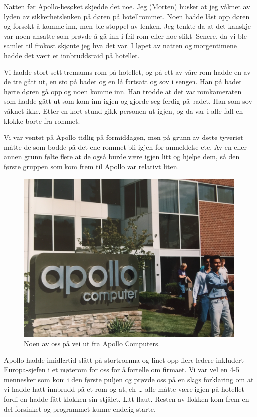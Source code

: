 \documentclass[../../main.tex]{subfiles}
\begin{document}
Natten før Apollo-besøket skjedde det noe. Jeg (Morten) husker at jeg våknet av lyden av sikkerhetslenken på døren på hotellrommet. Noen hadde låst opp døren og forsøkt å komme inn, men ble stoppet av lenken. Jeg tenkte da at det kanskje var noen ansatte som prøvde å gå inn i feil rom eller noe slikt. Senere, da vi ble samlet til frokost skjønte jeg hva det var. I løpet av natten og morgentimene hadde det vært et innbruddsraid på hotellet.

Vi hadde stort sett tremanns-rom på hotellet, og på ett av våre rom hadde en av de tre gått ut, en sto på badet og en lå fortsatt og sov i sengen. Han på badet hørte døren gå opp og noen komme inn. Han trodde at det var romkameraten som hadde gått ut som kom inn igjen og gjorde seg ferdig på badet. Han som sov våknet ikke. Etter en kort stund gikk personen ut igjen, og da var i alle fall en klokke borte fra rommet.

Vi var ventet på Apollo tidlig på formiddagen, men på grunn av dette tyveriet måtte de som bodde på det ene rommet bli igjen for anmeldelse etc. Av en eller annen grunn følte flere at de også burde være igjen litt og hjelpe dem, så den første gruppen som kom frem til Apollo var relativt liten. 

\begin{figure}
	\includegraphics[width=\linewidth]{images/usa88/IMG_3790.jpg}
	\caption{Noen av oss på vei ut fra Apollo Computers.}
\end{figure}

Apollo hadde imidlertid slått på stortromma og linet opp flere ledere inkludert Europa-sjefen i et møterom for oss for å fortelle om firmaet. Vi var vel en 4-5 mennesker som kom i den første puljen og prøvde oss på en slags forklaring om at vi hadde hatt innbrudd på et rom og at, eh … alle måtte være igjen på hotellet fordi en hadde fått klokken sin stjålet. Litt flaut. Resten av flokken kom frem en del forsinket og programmet kunne endelig starte.
\end{document}
